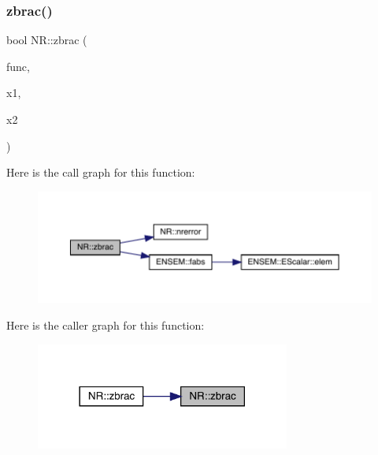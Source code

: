 \mbox{\label{namespaceNR_aec41661a6d34a54e59e37058f380730c}} 
\subsubsection{\texorpdfstring{zbrac()}{zbrac()}\hspace{0.1cm}{\footnotesize\ttfamily [1/2]}}
{\footnotesize\ttfamily bool N\+R\+::zbrac (\begin{DoxyParamCaption}\item[{const \mbox{\hyperlink{classNR_1_1ScalFunc}{Scal\+Func}} \&}]{func,  }\item[{\mbox{\hyperlink{namespaceNR_af6ff762dd605ff477b8e52387253a02a}{DP}} \&}]{x1,  }\item[{\mbox{\hyperlink{namespaceNR_af6ff762dd605ff477b8e52387253a02a}{DP}} \&}]{x2 }\end{DoxyParamCaption})}

Here is the call graph for this function\+:
\nopagebreak
\begin{figure}[H]
\begin{center}
\leavevmode
\includegraphics[width=350pt]{da/d46/namespaceNR_aec41661a6d34a54e59e37058f380730c_cgraph}
\end{center}
\end{figure}
Here is the caller graph for this function\+:
\nopagebreak
\begin{figure}[H]
\begin{center}
\leavevmode
\includegraphics[width=237pt]{da/d46/namespaceNR_aec41661a6d34a54e59e37058f380730c_icgraph}
\end{center}
\end{figure}
\mbox{\label{namespaceNR_a4dbd7cac092f614af934413917fc22d4}} 
